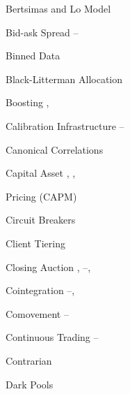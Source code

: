\begin{multicols}{2}
{Bertsimas and Lo Model \hfill \pageref{in:bert_lo} \par

Bid-ask Spread \hfill \pageref{in:bidask1}--\pageref{in:bidask2} \par

Binned Data \hfill \pageref{in:binned_data} \par

Black-Litterman Allocation \hfill \pageref{in:allo} \par

Boosting \hfill \pageref{in:boost1}, \pageref{in:boost2} \pspace





Calibration Infrastructure \hfill \pageref{in:calb1}--\pageref{in:calb2} \par

Canonical Correlations \hfill \pageref{in:cancor1} \par%

Capital Asset \hfill \pageref{in:capm1}, \pageref{in:capm2}, \pageref{in:capm3} \par \hspace{0.25cm} Pricing (CAPM) \par

Circuit Breakers \hfill \pageref{in:circ_br} \par

Client Tiering \hfill \pageref{in:client_t1}\par%

Closing Auction \hfill \pageref{in:close1}, \pageref{in:close2}--\pageref{in:close3}, \pageref{in:close4} \par

Cointegration \hfill \pageref{in:coint1}--\pageref{in:coint2}, \pageref{in:coint3} \par

Comovement \hfill \pageref{in:comove1}--\pageref{in:comove2} \par

Continuous Trading \hfill \pageref{in:cont_trade1}--\pageref{in:cont_trade2} \par

Contrarian \hfill \pageref{in:contrary} \pspace





Dark Pools \hfill \pageref{in:dark} \par

}
\end{multicols}
